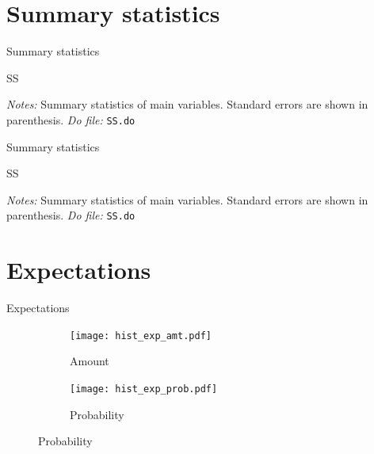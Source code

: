 \documentclass[8pt]{beamer}
\begin{document}
\section{Summary statistics}

\begin{frame}{Summary statistics}
    \begin{table}[H]
\caption{SS}
\begin{center}
\tiny{}
\end{center}
 \footnotesize
\textit{Notes:} Summary statistics of main variables. Standard errors are shown in parenthesis.   
\textit{Do file: } \texttt{SS.do}
\end{table}
\end{frame}

\begin{frame}{Summary statistics}
    \begin{table}[H]
\caption{SS}
\begin{center}
\tiny{}
\end{center}
 \footnotesize
\textit{Notes:} Summary statistics of main variables. Standard errors are shown in parenthesis.   
\textit{Do file: } \texttt{SS.do}
\end{table}
\end{frame}


\section{Expectations}

\begin{frame}{Expectations}
    

\begin{figure}[H]
    \caption{Histograms of expectations}
    \label{hist_exp}
    \begin{center}
        \begin{subfigure}{0.45\textwidth}
            \caption{Amount}
            \centering
            \texttt{[image: hist\_exp\_amt.pdf]}
        \end{subfigure}
        \begin{subfigure}{0.45\textwidth}
            \caption{Probability}
                \centering
                \texttt{[image: hist\_exp\_prob.pdf]}
        \end{subfigure}
        \end{center}
        \end{figure}
\end{frame}
\end{document}
